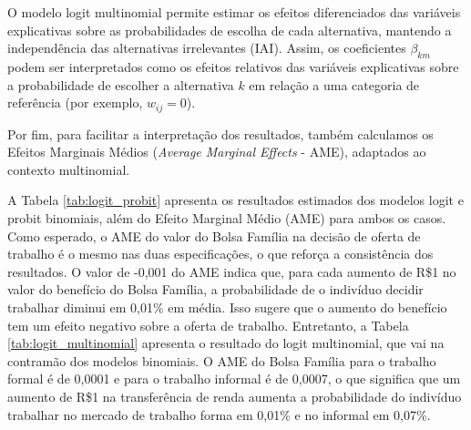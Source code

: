 \documentclass[12pt, a4paper, openany]{book}
\numberwithin{equation}{chapter}
\numberwithin{table}{chapter}
\numberwithin{figure}{chapter}
\theoremstyle{break}
\begin{document}
O modelo logit multinomial permite estimar os efeitos diferenciados das variáveis explicativas sobre as probabilidades de escolha de cada alternativa, mantendo a independência das alternativas irrelevantes (IAI). Assim, os coeficientes \(\beta_{km}\) podem ser interpretados como os efeitos relativos das variáveis explicativas sobre a probabilidade de escolher a alternativa \(k\) em relação a uma categoria de referência (por exemplo, \(w_{ij} = 0\)).

Por fim, para facilitar a interpretação dos resultados, também calculamos os Efeitos Marginais Médios (\textit{Average Marginal Effects} - AME), adaptados ao contexto multinomial.

A Tabela \ref{tab:logit_probit} apresenta os resultados estimados dos modelos logit e probit binomiais, além do Efeito Marginal Médio (AME) para ambos os casos. Como esperado, o AME do valor do Bolsa Família na decisão de oferta de trabalho é o mesmo nas duas especificações, o que reforça a consistência dos resultados. O valor de -0,001 do AME indica que, para cada aumento de R\$1 no valor do benefício do Bolsa Família, a probabilidade de o indivíduo decidir trabalhar diminui em 0,01\% em média. Isso sugere que o aumento do benefício tem um efeito negativo sobre a oferta de trabalho. Entretanto, a Tabela \ref{tab:logit_multinomial} apresenta o resultado do logit multinomial, que vai na contramão dos modelos binomiais. O AME do Bolsa Família para o trabalho formal é de 0,0001 e para o trabalho informal é de 0,0007, o que significa que um aumento de R\$1 na transferência de renda aumenta a probabilidade do indivíduo trabalhar no mercado de trabalho forma em 0,01\% e no informal em 0,07\%.
\end{document}
